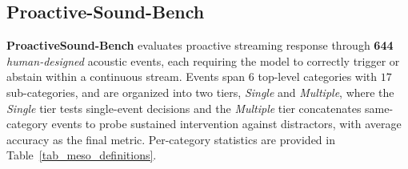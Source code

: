 \documentclass{llmxive}
\begin{document}

\vspace{-1.5mm}
\subsection{Proactive-Sound-Bench}
\label{sec:proactive_bench}
 \vspace{-1.5mm}
\textbf{ProactiveSound-Bench} evaluates proactive streaming response through \textbf{644} \textit{human-designed} acoustic events, each requiring the model to correctly trigger or abstain within a continuous stream. Events span 6 top-level categories with $17$ sub-categories, and are organized into two tiers, \emph{Single} and \emph{Multiple}, where the \emph{Single} tier tests single-event decisions and the \emph{Multiple} tier concatenates same-category events to probe sustained intervention against distractors, with average accuracy as the final metric. Per-category statistics are provided in Table~\ref{tab_meso_definitions}.

 
\end{document}

